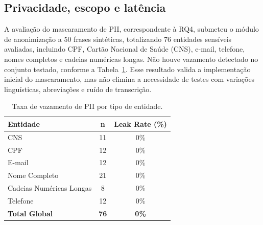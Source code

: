 
\subsection{Privacidade, escopo e latência}

A avaliação do mascaramento de PII, correspondente à RQ4, submeteu o módulo de anonimização a 50 frases sintéticas, totalizando 76 entidades sensíveis avaliadas, incluindo CPF, Cartão Nacional de Saúde (CNS), e-mail, telefone, nomes completos e cadeias numéricas longas.
Não houve vazamento detectado no conjunto testado, conforme a Tabela~\ref{tab:pii_leak}. Esse resultado valida a implementação inicial do mascaramento, mas não elimina a necessidade de testes com variações linguísticas, abreviações e ruído de transcrição.

\begin{table}[b!]
  \centering
  \caption{Taxa de vazamento de PII por tipo de entidade.}
  \label{tab:pii_leak}
  \begin{tabular}{lcc}
  	\toprule
	\textbf{Entidade} 	 	                & \textbf{n} 		                & \textbf{Leak Rate (\%)} \\
	\midrule
  	CNS     			                      & 11                            & 0\%                   \\
  	CPF                                 & 12                            & 0\%                   \\
  	E-mail                              & 12                            & 0\%                   \\
  	Nome Completo			                  & 21                            & 0\%                   \\
  	Cadeias Numéricas Longas            & 8                             & 0\%                   \\
  	Telefone                            & 12                            & 0\%                   \\
	\midrule
  	\textbf{Total Global}               & \textbf{76}                   & \textbf{0\%}          \\
  	\bottomrule
  \end{tabular}
  \end{table}

